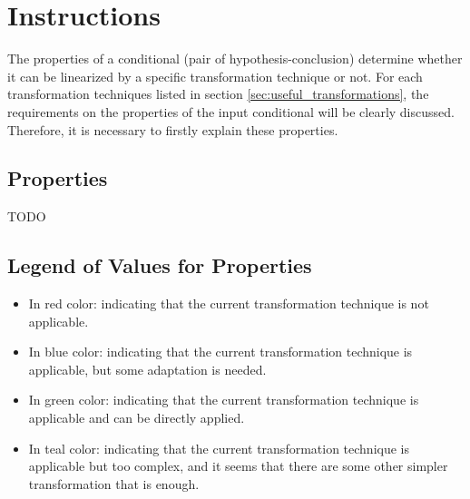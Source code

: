 \documentclass[onecolumn]{ctexart}
\begin{document}


\vspace{30pt}
\section{Instructions}

The properties of a conditional (pair of hypothesis-conclusion)
determine
whether it can be linearized by a specific transformation technique or not.
For each transformation techniques listed in section \ref{sec:useful_transformations},
the requirements on the properties of the input conditional
will be clearly discussed.
Therefore, it is necessary to firstly
explain these properties.


\subsection{Properties}

TODO


\subsection{Legend of Values for Properties}


\begin{itemize}
    \item  {\color{red}       In red   color}: indicating that the current transformation technique is not applicable.
    \item  {\color{blue}      In blue  color}: indicating that the current transformation technique is applicable, but some adaptation is needed.
    \item  {\color{LimeGreen} In green color}: indicating that the current transformation technique is applicable and can be directly applied.
    \item  {\color{Teal}      In teal  color}: indicating that the current transformation technique is applicable but too complex, and it seems that there are some other simpler transformation that is enough.
\end{itemize}
\end{document}

